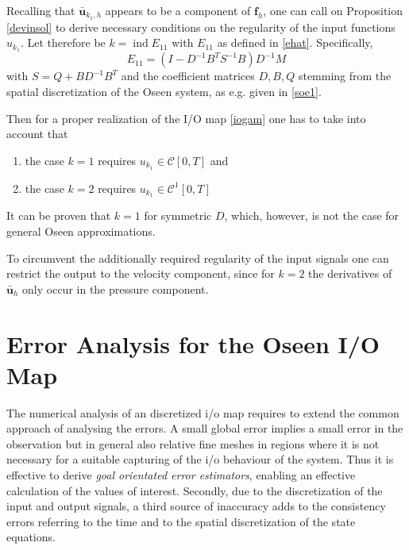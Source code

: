\documentclass[a4paper,10pt,BCOR=15mm]{scrbook}
\DeclareMathOperator{\ind}{ind}
\begin{document}
Recalling that $\bar {\mathbf u}_{k_1,h}$ appears to be a component of $\mathbf f_h$, one can call on Proposition \ref{devinsol} to derive necessary conditions on the regularity of the input functions $u_{k_1}$. Let therefore be $k = \ind E_{11}$ with $E_{11}$ as defined in \eqref{ehat}. Specifically,
\begin{equation*}
  E_{11} = (I-D^{-1}B^TS^{-1}B)D^{-1}M 
\end{equation*}
with $S=Q+BD^{-1}B^T$ and the coefficient matrices $D,B,Q$ stemming from the spatial discretization of the Oseen system, as e.g. given in \eqref{soe1}. 

Then for a proper realization of the I/O map \eqref{iogam} one has to take into account that
\begin{enumerate}
 \item the case $k=1$ requires $u_{k_1} \in \mathcal C[0,T]$ and
 \item the case $k=2$ requires $u_{k_1} \in \mathcal C^1[0,T]$
\end{enumerate}

It can be proven that $k=1$ for symmetric $D$, which, however, is not the case for general Oseen approximations. 

To circumvent the additionally required regularity of the input signals one can restrict the output to the velocity component, since for $k=2$ the derivatives of $\bar {\mathbf u}_h$ only occur in the pressure component.

\chapter{Error Analysis for the Oseen I/O Map}
The numerical analysis of an discretized i/o map requires to extend the common approach of analysing the errors. A small global error implies a small error in the observation but in general also relative fine meshes in regions where it is not necessary for a suitable capturing of the i/o behaviour of the system. Thus it is effective to derive \textit{goal orientated error estimators}, enabling an effective calculation of the values of interest. Secondly, due to the discretization of the input and output signals, a third source of inaccuracy adds to the consistency errors referring to the time and to the spatial discretization of the state equations. 
\end{document}
